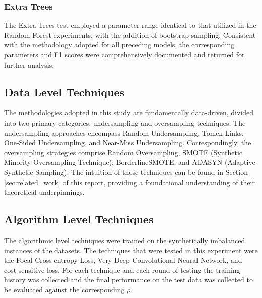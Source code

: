 \documentclass[journal]{IEEEtran}
\begin{document}
	\subsubsection{Extra Trees}
	The Extra Trees test employed a parameter range identical to that utilized in the Random Forest experiments, with the addition of bootstrap sampling. Consistent with the methodology adopted for all preceding models, the corresponding parameters and F1 scores were comprehensively documented and returned for further analysis.


\subsection{Data Level Techniques}

	The methodologies adopted in this study are fundamentally data-driven, 
	divided into two primary categories: undersampling and oversampling techniques. 
	The undersampling approaches encompass Random Undersampling, Tomek Links, One-Sided Undersampling, and Near-Miss Undersampling. 
	Correspondingly, the oversampling strategies comprise Random Oversampling, SMOTE (Synthetic Minority Oversampling Technique), BorderlineSMOTE, and ADASYN (Adaptive Synthetic Sampling). 
	The intuition of these techniques can be found in Section \ref{sec:related_work} of this report, providing a foundational understanding of their theoretical underpinnings.
		

\subsection{Algorithm Level Techniques}

	The algorithmic level techniques were trained on the synthetically imbalanced instances of the datasets.
	The techniques that were tested in this experiment were the Focal Cross-entropy Loss,
	Very Deep Convolutional Neural Network, and cost-sensitive loss.
	For each technique and each round of testing the training history was collected
	and the final performance on the test data was collected to be evaluated against the
	corresponding $\rho$.
\end{document}
